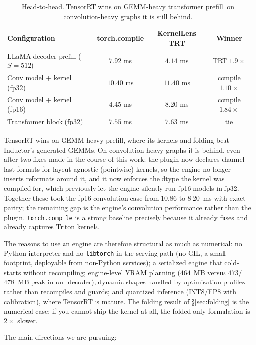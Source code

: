\documentclass[11pt,a4paper]{article}
\begin{document}
\begin{table}[h!]
\centering
\small
\begin{tabular}{lccc}
\toprule
\textbf{Configuration} & \textbf{torch.compile} & \textbf{KernelLens TRT} & \textbf{Winner} \\ \midrule
LLaMA decoder prefill ($S{=}512$) & $7.92$ ms & $\mathbf{4.14}$ ms & TRT $1.9\times$ \\
Conv model $+$ kernel (fp32) & $\mathbf{10.40}$ ms & $11.40$ ms & compile $1.10\times$ \\
Conv model $+$ kernel (fp16) & $\mathbf{4.45}$ ms & $8.20$ ms & compile $1.84\times$ \\
Transformer block (fp32) & $7.55$ ms & $7.63$ ms & tie \\
\bottomrule
\end{tabular}
\caption{Head-to-head. TensorRT wins on GEMM-heavy transformer prefill; on
convolution-heavy graphs it is still behind.}
\label{tab:enginewins}
\end{table}

TensorRT wins on GEMM-heavy prefill, where its kernels and folding beat
Inductor's generated GEMMs. On convolution-heavy graphs it is behind, even after
two fixes made in the course of this work: the plugin now declares channel-last
formats for layout-agnostic (pointwise) kernels, so the engine no longer inserts
reformats around it, and it now enforces the dtype the kernel was compiled for,
which previously let the engine silently run fp16 models in fp32. Together these
took the fp16 convolution case from $10.86$ to $8.20$~ms with exact parity; the
remaining gap is the engine's convolution performance rather than the plugin.
\texttt{torch.compile} is a strong baseline precisely because it already fuses
and already captures Triton kernels.

The reasons to use an engine are therefore structural as much as numerical:
no Python interpreter and no \texttt{libtorch} in the serving path (no GIL, a
small footprint, deployable from non-Python services); a serialized engine that
cold-starts without recompiling; engine-level VRAM planning ($464$~MB versus
$473$/$478$~MB peak in our decoder); dynamic shapes handled by optimisation
profiles rather than recompiles and guards; and quantized inference (INT8/FP8
with calibration), where TensorRT is mature. The folding result of
\S\ref{sec:folding} is the numerical case: if you cannot ship the kernel at all,
the folded-only formulation is $2\times$ slower.

The main directions we are pursuing:
\end{document}
